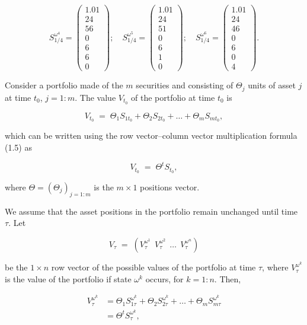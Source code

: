 \[
S_{1/4}^{\omega^4} = \begin{pmatrix}1.01\\24\\56\\0\\6\\6\\0\end{pmatrix}; \quad
S_{1/4}^{\omega^5} = \begin{pmatrix}1.01\\24\\51\\0\\6\\1\\0\end{pmatrix}; \quad
S_{1/4}^{\omega^6} = \begin{pmatrix}1.01\\24\\46\\0\\6\\0\\4\end{pmatrix}.
\]

Consider a portfolio made of the $m$ securities and consisting of
$\Theta_j$ units of asset $j$ at time $t_0$, $j=1:m$. The value $V_{t_0}$
of the portfolio at time $t_0$ is

\[
V_{t_0} \;=\; \Theta_1S_{1t_0}+\Theta_2S_{2t_0}+\ldots+\Theta_mS_{mt_0},
\]

which can be written using the row vector--column vector multiplication
formula (1.5) as

\[
V_{t_0} \;=\; \Theta^tS_{t_0},
\]

where $\Theta=(\Theta_j)_{j=1:m}$ is the $m\times 1$ positions vector.

We assume that the asset positions in the portfolio remain unchanged until
time $\tau$. Let

\begin{equation}
V_\tau \;=\; \left(V_\tau^{\omega^1}\ \ V_\tau^{\omega^2}\ \ \ldots\ \
V_\tau^{\omega^n}\right)
\end{equation}

be the $1\times n$ row vector of the possible values of the portfolio at
time $\tau$, where $V_\tau^{\omega^k}$ is the value of the portfolio if
state $\omega^k$ occurs, for $k=1:n$. Then,

\begin{equation}
\begin{aligned}
V_\tau^{\omega^k} &= \Theta_1S_{1\tau}^{\omega^k}+\Theta_2S_{2\tau}^{\omega^k}
+\ldots+\Theta_mS_{m\tau}^{\omega^k} \\
&= \Theta^tS_\tau^{\omega^k},
\end{aligned}
\end{equation}

